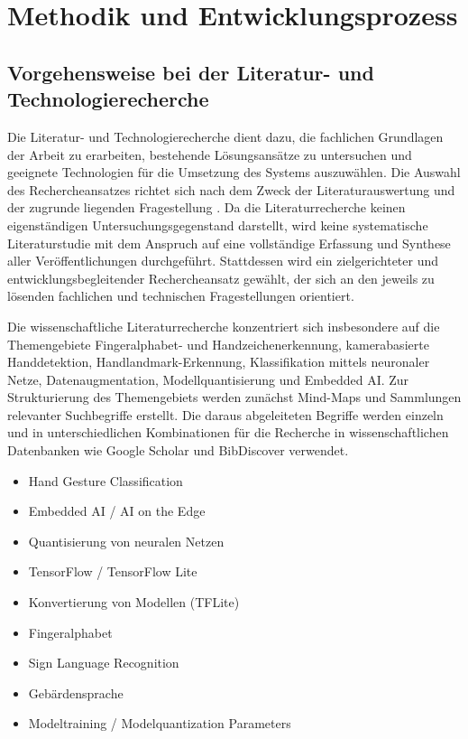 \chapter{Methodik und Entwicklungsprozess}\label{ch:methodik}

\section{Vorgehensweise bei der Literatur- und Technologierecherche}\label{sec:literaturrecherche}

Die Literatur- und Technologierecherche dient dazu, die fachlichen Grundlagen der Arbeit zu erarbeiten, bestehende Lösungsansätze zu untersuchen und geeignete Technologien für die Umsetzung des Systems auszuwählen. Die Auswahl des Rechercheansatzes richtet sich nach dem Zweck der Literaturauswertung und der zugrunde liegenden Fragestellung \cite[S. 334]{snyderLiteratureReviewResearch2019}. Da die Literaturrecherche keinen eigenständigen Untersuchungsgegenstand darstellt, wird keine systematische Literaturstudie mit dem Anspruch auf eine vollständige Erfassung und Synthese aller Veröffentlichungen durchgeführt. Stattdessen wird ein zielgerichteter und entwicklungsbegleitender Rechercheansatz gewählt, der sich an den jeweils zu lösenden fachlichen und technischen Fragestellungen orientiert.

Die wissenschaftliche Literaturrecherche konzentriert sich insbesondere auf die Themengebiete Fingeralphabet- und Handzeichenerkennung, kamerabasierte Handdetektion, Hand\-landmark-Erkennung, Klassifikation mittels neuronaler Netze, Datenaugmentation, Modellquantisierung und Embedded AI. Zur Strukturierung des Themengebiets werden zunächst Mind-Maps und Sammlungen relevanter Suchbegriffe erstellt. Die daraus abgeleiteten Begriffe werden einzeln und in unterschiedlichen Kombinationen für die Recherche in wissenschaftlichen Datenbanken wie Google Scholar und BibDiscover verwendet.

\begin{itemize}
    \item Hand Gesture Classification
    \item Embedded AI / AI on the Edge
    \item Quantisierung von neuralen Netzen
    \item TensorFlow / TensorFlow Lite
    \item Konvertierung von Modellen (TFLite)
    \item Fingeralphabet
    \item Sign Language Recognition
    \item Gebärdensprache
    \item Modeltraining / Modelquantization Parameters
\end{itemize}

